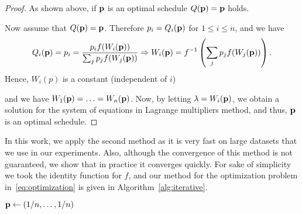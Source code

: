 \begin{proof}
	As shown above, if $\sched$ is an optimal schedule $Q(\mathbf{p})=\mathbf{p}$ holds.

	Now assume that $Q(\mathbf{p})=\mathbf{p}$. Therefore $p_i = Q_i(\mathbf{p})$ for $1\leq i \leq n$,
	and we have
	\begin{align*}
	Q_i(\mathbf{p}) = p_i = \frac{p_i f(W_i(\mathbf{p}))}{\sum_{j} p_j f(W_j(\mathbf{p}))}
	\Rightarrow
	W_i(\mathbf{p}) = f^{-1}\left(\sum_{j} p_j f(W_j(\mathbf{p}))\right).
	\end{align*}
	Hence, $W_i(p)$ is a constant (independent of $i$)


	and we have
	$W_1(\mathbf{p})=\ldots=W_n(\mathbf{p})$. Now, by letting $\lambda = W_i(\mathbf{p})$, we obtain a
	solution for the system of equations in Lagrange multipliers method, and
	thus, $\sched$ is an optimal schedule.
\end{proof}

In this work, we apply the second method as it is very fast on large datasets
that we use in our experiments. Also, although the convergence of this method is
not guaranteed, we show that in practice it converges quickly. For sake of
simplicity we took the identity function for $f$, and our method for the
optimization problem in~\eqref{eq:optimization} is given in
Algorithm~\ref{alg:iterative}.


\begin{algorithm}[ht]
	\DontPrintSemicolon
	$\mathbf{p} \leftarrow (1/n, \ldots, 1/n)$\;
	\Return{$\sched$}\;
	\caption{$\optimizer(\texttt{iterations})$}
	\label{alg:iterative}
\end{algorithm}


\iffalse

